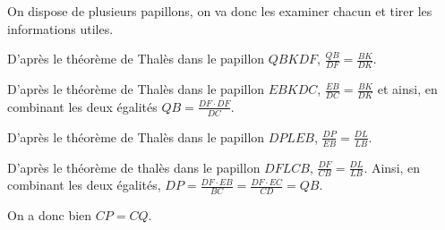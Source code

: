 \begin{sol}
\begin{center}
\end{center}

On dispose de plusieurs papillons, on va donc les examiner chacun et tirer les informations utiles.

D'après le théorème de Thalès dans le papillon $QBKDF$, $\frac{QB}{DF} = \frac{BK}{DK}$.

D'après le théorème de Thalès dans le papillon $EBKDC$, $\frac{EB}{DC} = \frac{BK}{DK}$ et ainsi, en combinant les deux égalités $QB = \frac{DF \cdot DF}{DC}$.

D'après le théorème de Thalès dans le papillon $DPLEB$, $\frac{DP}{EB} = \frac{DL}{LB}$.

D'après le théorème de thalès dans le papillon $DFLCB$, $\frac{DF}{CB} = \frac{DL}{LB}$. Ainsi, en combinant les deux égalités, $DP = \frac{DF\cdot EB}{BC} = \frac{DF\cdot EC}{CD} = QB$.

On a donc bien $CP = CQ$.
\end{sol}


